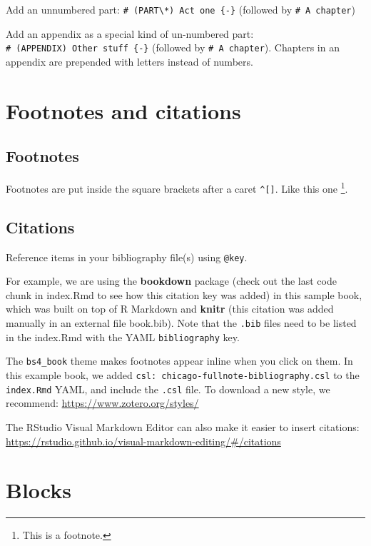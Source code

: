 \documentclass[
]{book}
\theoremstyle{definition}
\theoremstyle{definition}
\theoremstyle{definition}
\theoremstyle{definition}
\theoremstyle{remark}
\begin{document}
Add an unnumbered part: \texttt{\#\ (PART\textbackslash{}*)\ Act\ one\ \{-\}} (followed by \texttt{\#\ A\ chapter})

Add an appendix as a special kind of un-numbered part: \texttt{\#\ (APPENDIX)\ Other\ stuff\ \{-\}} (followed by \texttt{\#\ A\ chapter}). Chapters in an appendix are prepended with letters instead of numbers.

\hypertarget{footnotes-and-citations}{%
\chapter{Footnotes and citations}\label{footnotes-and-citations}}

\hypertarget{footnotes}{%
\section{Footnotes}\label{footnotes}}

Footnotes are put inside the square brackets after a caret \texttt{\^{}{[}{]}}. Like this one \footnote{This is a footnote.}.

\hypertarget{citations}{%
\section{Citations}\label{citations}}

Reference items in your bibliography file(s) using \texttt{@key}.

For example, we are using the \textbf{bookdown} package \citep{R-bookdown} (check out the last code chunk in index.Rmd to see how this citation key was added) in this sample book, which was built on top of R Markdown and \textbf{knitr} \citep{xie2015} (this citation was added manually in an external file book.bib).
Note that the \texttt{.bib} files need to be listed in the index.Rmd with the YAML \texttt{bibliography} key.

The \texttt{bs4\_book} theme makes footnotes appear inline when you click on them. In this example book, we added \texttt{csl:\ chicago-fullnote-bibliography.csl} to the \texttt{index.Rmd} YAML, and include the \texttt{.csl} file. To download a new style, we recommend: \url{https://www.zotero.org/styles/}

The RStudio Visual Markdown Editor can also make it easier to insert citations: \url{https://rstudio.github.io/visual-markdown-editing/\#/citations}

\hypertarget{blocks}{%
\chapter{Blocks}\label{blocks}}
\end{document}
